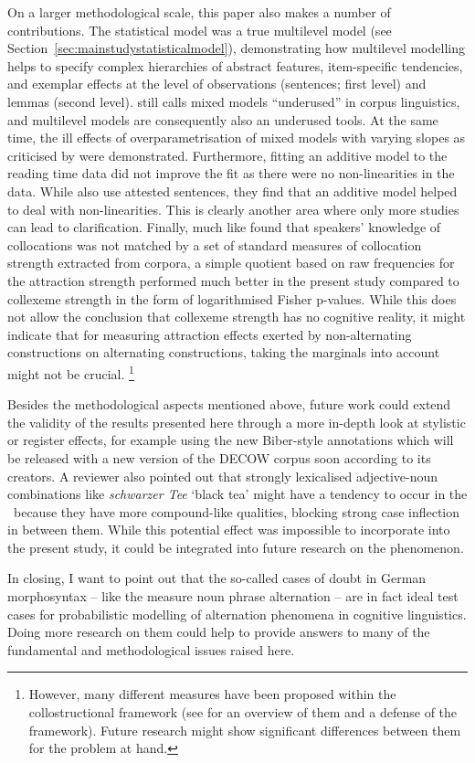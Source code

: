 On a larger methodological scale, this paper also makes a number of contributions.
The statistical model was a true multilevel model (see Section~\ref{sec:mainstudystatisticalmodel}), demonstrating how multilevel modelling helps to specify complex hierarchies of abstract features, item-specific tendencies, and exemplar effects at the level of observations (sentences; first level) and lemmas (second level).
\citet{Gries2015} still calls mixed models ``underused'' in corpus linguistics, and multilevel models are consequently also an underused tools.
At the same time, the ill effects of overparametrisation of mixed models with varying slopes as criticised by \citet{BatesEa2015a} were demonstrated.
Furthermore, fitting an additive model to the reading time data did not improve the fit as there were no non-linearities in the data.
While \citet{DivjakEa2016} also use attested sentences, they find that an additive model helped to deal with non-linearities.
This is clearly another area where only more studies can lead to clarification.
Finally, much like \citet{Dabrowska2014} found that speakers' knowledge of collocations was not matched by a set of standard measures of collocation strength extracted from corpora, a simple quotient based on raw frequencies for the attraction strength performed much better in the present study compared to collexeme strength in the form of logarithmised Fisher p-values. 
While this does not allow the conclusion that collexeme strength has no cognitive reality, it might indicate that for measuring attraction effects exerted by non-alternating constructions on alternating constructions, taking the marginals into account might not be crucial.%
\footnote{However, many different measures have been proposed within the collostructional framework (see \citealp{Gries2015b} for an overview of them and a defense of the framework).
Future research might show significant differences between them for the problem at hand.}

Besides the methodological aspects mentioned above, future work could extend the validity of the results presented here through a more in-depth look at stylistic or register effects, for example using the new Biber-style annotations \citep{Biber1988} which will be released with a new version of the DECOW corpus soon according to its creators.
A reviewer also pointed out that strongly lexicalised adjective-noun combinations like \textit{schwarzer Tee} `black tea' might have a tendency to occur in the \NACa\ because they have more compound-like qualities, blocking strong case inflection in between them.
While this potential effect was impossible to incorporate into the present study, it could be integrated into future research on the phenomenon.

In closing, I want to point out that the so-called cases of doubt in German morphosyntax -- like the measure noun phrase alternation -- are in fact ideal test cases for probabilistic modelling of alternation phenomena in cognitive linguistics.
Doing more research on them could help to provide answers to many of the fundamental and methodological issues raised here.
